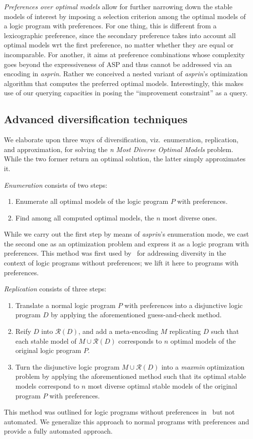 \documentclass[a4paper,USenglish]{oasics-v2016}
\newcommand{\sysfont}{\textit}
\newcommand{\asprin}{\sysfont{asprin}}
\begin{document}
\emph{Preferences over optimal models}
%
allow for further narrowing down the stable models of interest by imposing a selection criterion among the optimal models of a logic program with preferences.
%
For one thing, this is different from a lexicographic preference, since the secondary preference takes into account all optimal models wrt the first
preference, no matter whether they are equal or incomparable.
For another, it aims at preference combinations whose complexity goes beyond the expressiveness of ASP and thus cannot be addressed via an encoding
in \asprin.
Rather we conceived a nested variant of \asprin's optimization algorithm that computes the preferred optimal models.
Interestingly, this makes use of our querying capacities in posing the ``improvement constraint'' as a query.

\subsection{Advanced diversification techniques}
We elaborate upon three ways of diversification, viz.\ enumeration, replication, and approximation,
for solving the \emph{n Most Diverse Optimal Models} problem. 
%
While the two former return an optimal solution, the latter simply approximates it.

\emph{Enumeration} consists of two steps:
\begin{enumerate}
\item Enumerate all optimal models of the logic program $P$ with preferences. 
\item Find among all computed optimal models, the $n$ most diverse ones.
\end{enumerate}
While we carry out the first step by means of \asprin's enumeration mode,
we cast the second one as an optimization problem and express it as a logic program with preferences.
%
This method was first used by~\cite{eiererfi13a} for addressing diversity in the context of logic programs without preferences;
we lift it here to programs with preferences.

\emph{Replication} consists of three steps:
\begin{enumerate}
\item Translate a normal logic program $P$ with preferences into a disjunctive logic program $D$
  by applying the aforementioned guess-and-check method.
\item Reify $D$ into $\mathcal{R}(D)$, and add a meta-encoding $M$ replicating $D$ 
  such that each stable model of $M \cup \mathcal{R}(D)$ 
  corresponds to $n$ optimal models of the original logic program $P$.
\item Turn the disjunctive logic program $M \cup \mathcal{R}(D)$ into a \emph{maxmin} optimization problem
  by applying the aforementioned method such that its optimal stable models
  correspond to $n$ most diverse optimal stable models of the original program $P$ with preferences.
\end{enumerate}
%
This method was outlined for logic programs without preferences in~\cite{eiererfi13a} but not automated.
We generalize this approach to normal programs with preferences and provide a fully automated approach.
\end{document}
